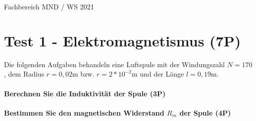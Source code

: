 \documentclass{article}
\begin{document}
Fachbereich MND / WS 2021


\part*{Test 1 - Elektromagnetismus (7P)}

Die folgenden Aufgaben behandeln eine Luftspule mit der Windungszahl $N=170$, dem Radius $r=0{,}02$m bzw. $r=2*10^{ -2 }$m und der Länge $l=0{,}19$m.

\subsection*{Berechnen Sie die Induktivität der Spule (3P)}


\vspace{\baselineskip}\vspace{\baselineskip}\vspace{\baselineskip}

\subsection*{Bestimmen Sie den magnetischen Widerstand $R_{m}$ der Spule (4P)}


\vspace{\baselineskip}
\end{document}
